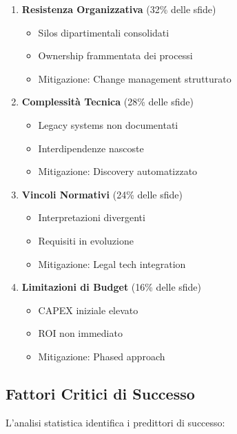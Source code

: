 \begin{enumerate}
\item \textbf{Resistenza Organizzativa} (32\% delle sfide)
\begin{itemize}
\item Silos dipartimentali consolidati
\item Ownership frammentata dei processi
\item Mitigazione: Change management strutturato
\end{itemize}

\item \textbf{Complessità Tecnica} (28\% delle sfide)
\begin{itemize}
\item Legacy systems non documentati
\item Interdipendenze nascoste
\item Mitigazione: Discovery automatizzato
\end{itemize}

\item \textbf{Vincoli Normativi} (24\% delle sfide)
\begin{itemize}
\item Interpretazioni divergenti
\item Requisiti in evoluzione
\item Mitigazione: Legal tech integration
\end{itemize}

\item \textbf{Limitazioni di Budget} (16\% delle sfide)
\begin{itemize}
\item CAPEX iniziale elevato
\item ROI non immediato
\item Mitigazione: Phased approach
\end{itemize}
\end{enumerate}

\subsection{Fattori Critici di Successo}

L'analisi statistica identifica i predittori di successo:

